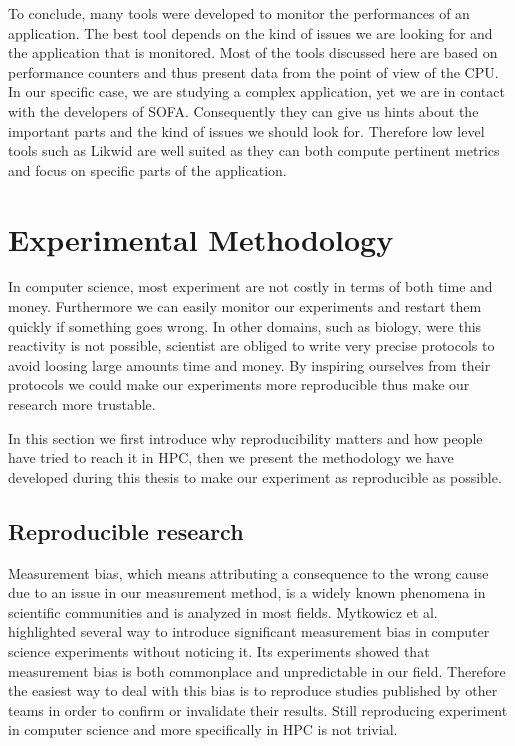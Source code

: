To conclude, many tools were developed to monitor the performances of an application.
The best tool depends on the kind of issues we are looking for and the application that is monitored.
Most of the tools discussed here are based on performance counters and thus present data from the point of view of the \gls{CPU}.
In our specific case, we are studying a complex application, yet we are in contact with the developers of \gls{SOFA}.
Consequently they can give us hints about the important parts and the kind of issues we should look for.
Therefore low level tools such as \gls{Likwid} are well suited as they can both compute pertinent metrics and focus on specific parts of the application.

\section{Experimental Methodology}
\label{sec:expe-methodo}

In computer science, most experiment are not costly in terms of both time and money.
Furthermore we can easily monitor our experiments and restart them quickly if something goes wrong.
In other domains, such as biology,  were this reactivity is not possible, scientist are obliged to write very precise protocols to avoid loosing large amounts time and money.
By inspiring ourselves from their protocols we could make our experiments more reproducible thus make our research more trustable.

In this section we first introduce why reproducibility matters and how people have tried to reach it in \gls{HPC}, then we present the methodology we have developed during this thesis to make our experiment as reproducible as possible.


\subsection{Reproducible research}

Measurement bias, which means attributing a consequence to the wrong cause due to an issue in our measurement method, is a widely known phenomena in scientific communities and is analyzed in most fields.
Mytkowicz et al.~\cite{Mytkowicz09Producing} highlighted several way to introduce significant measurement bias in computer science experiments without noticing it.
Its experiments showed that measurement bias is both commonplace and unpredictable in our field.
Therefore the easiest way to deal with this bias is to reproduce studies published by other teams in order to confirm or invalidate their results.
Still reproducing experiment in computer science and more specifically in \gls{HPC} is not trivial.

